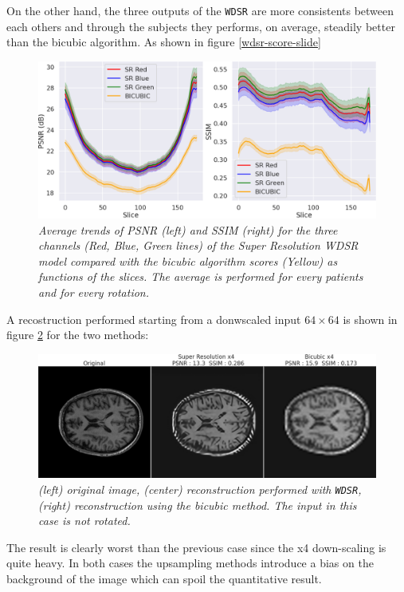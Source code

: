 \documentclass[12pt,a4paper]{report}
\begin{document}
On the other hand, the three outputs of the {\tt WDSR} are more consistents between each others and through the subjects they performs, on average, steadily better than the bicubic algorithm. As shown in figure \ref{wdsr-score-slide}    

\begin{figure}[H]
  \centering
 \includegraphics[scale=0.37]{./images/wdsr_score_slide.png}
  \caption{\it Average trends of PSNR (left) and SSIM (right) for the three channels (Red, Blue, Green lines) of the Super Resolution WDSR model compared with the bicubic algorithm scores (Yellow) as functions of the slices. The average is performed for every patients and for every rotation.}
 \label{fig:wdsr-score-slide}
\end{figure}

A recostruction performed starting from a donwscaled input $64 \times 64$ is shown in figure \ref{wdsr-upscale} for the two methods:

\begin{figure}[H]
 \centering
  \includegraphics[scale=0.3]{images/wdsr-comp-images.png}
  \caption{\it (left) original image, (center) reconstruction performed with {\tt WDSR}, (right) reconstruction using the bicubic method. The input in this case is not rotated.}
 \label{wdsr-upscale}
\end{figure}

The result is clearly worst than the previous case since the x4 down-scaling is quite heavy.
In both cases the upsampling methods introduce a bias on the background of the image which can spoil the quantitative result.
\end{document}
